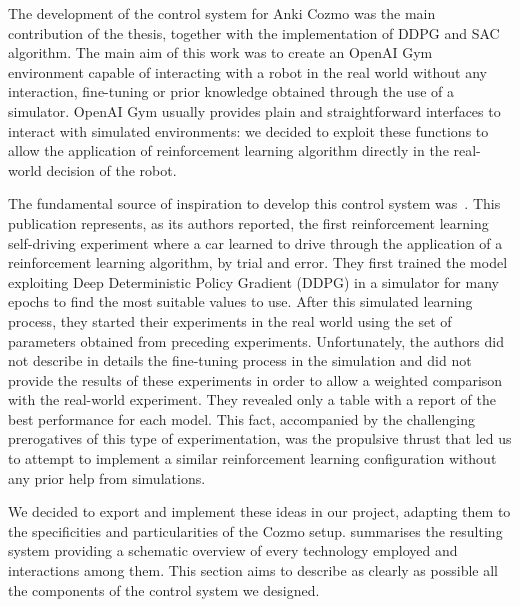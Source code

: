 The development of the control system for Anki Cozmo was the main contribution of the thesis, together with the implementation of DDPG and SAC algorithm.
The main aim of this work was to create an OpenAI Gym environment capable of interacting with a robot in the real world without any interaction, fine-tuning or prior knowledge obtained through the use of a simulator.
OpenAI Gym usually provides plain and straightforward interfaces to interact with simulated environments: we decided to exploit these functions to allow the application of reinforcement learning algorithm directly in the real-world decision of the robot.


The fundamental source of inspiration to develop this control system was~\cite{kendall2018learning,kendall2019learning}.
This publication represents, as its authors reported, the first reinforcement learning self-driving experiment where a car learned to drive through the application of a reinforcement learning algorithm, by trial and error.
They first trained the model exploiting Deep Deterministic Policy Gradient (DDPG) in a simulator for many epochs to find the most suitable values to use.
After this simulated learning process, they started their experiments in the real world using the set of parameters obtained from preceding experiments.
Unfortunately, the authors did not describe in details the fine-tuning process in the simulation and did not provide the results of these experiments in order to allow a weighted comparison with the real-world experiment.
They revealed only a  table with a report of the best performance for each model.
This fact, accompanied by the challenging prerogatives of this type of experimentation, was the propulsive thrust that led us to attempt to implement a similar reinforcement learning configuration without any prior help from simulations.

We decided to export and implement these ideas in our project, adapting them to the specificities and particularities of the Cozmo setup.
 summarises the resulting system providing a schematic overview of every technology employed and interactions among them.
This section aims to describe as clearly as possible all the components of the control system we designed.


